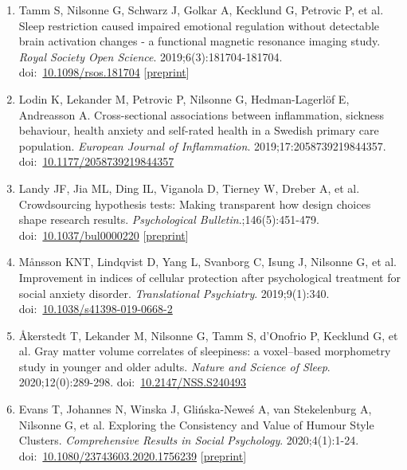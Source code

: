 \documentclass[10pt,a4paper,twocolumn]{article}
\begin{document}
\begin{enumerate}
    \item Tamm S, Nilsonne G, Schwarz J, Golkar A, Kecklund G, Petrovic P, et al. Sleep restriction caused impaired emotional regulation without detectable brain activation changes - a functional magnetic resonance imaging study. \textit{Royal Society Open Science}. 2019;6(3):181704-181704. doi:~\href{https://doi.org/10.1098/rsos.181704}{10.1098/rsos.181704} [\href{http://doi.org/10.1101/436048}{preprint}]

    \item Lodin K, Lekander M, Petrovic P, Nilsonne G, Hedman-Lagerlöf E, Andreasson A. Cross-sectional associations between inflammation, sickness behaviour, health anxiety and self-rated health in a Swedish primary care population. \textit{European Journal of Inflammation}. 2019;17:2058739219844357. doi:~\href{https://doi.org/10.1177/2058739219844357}{10.1177/2058739219844357}

    \item Landy JF, Jia ML, Ding IL, Viganola D, Tierney W, Dreber A, et al. Crowdsourcing hypothesis tests: Making transparent how design choices shape research results. \textit{Psychological Bulletin}.;146(5):451-479. doi:~\href{https://doi.org/10.1037/bul0000220}{10.1037/bul0000220} [\href{http://repository.essex.ac.uk/id/eprint/25784}{preprint}]

    \item Månsson KNT, Lindqvist D, Yang L, Svanborg C, Isung J, Nilsonne G, et al. Improvement in indices of cellular protection after psychological treatment for social anxiety disorder. \textit{Translational Psychiatry}. 2019;9(1):340. doi:~\href{https://doi.org/10.1038/s41398-019-0668-2}{10.1038/s41398-019-0668-2}

    \item Åkerstedt T, Lekander M, Nilsonne G, Tamm S, d'Onofrio P, Kecklund G, et al. Gray matter volume correlates of sleepiness: a voxel–based morphometry study in younger and older adults. \textit{Nature and Science of Sleep}. 2020;12(0):289-298. doi:~\href{https://doi.org/10.2147/NSS.S240493}{10.2147/NSS.S240493}

    \item Evans T, Johannes N, Winska J, Glińska-Neweś A, van Stekelenburg A, Nilsonne G, et al. Exploring the Consistency and Value of Humour Style Clusters. \textit{Comprehensive Results in Social Psychology}. 2020;4(1):1-24. doi:~\href{https://doi.org/10.1080/23743603.2020.1756239}{10.1080/23743603.2020.1756239} [\href{https://doi.org/10.31234/osf.io/b8g9z}{preprint}]


\end{enumerate}
\end{document}
